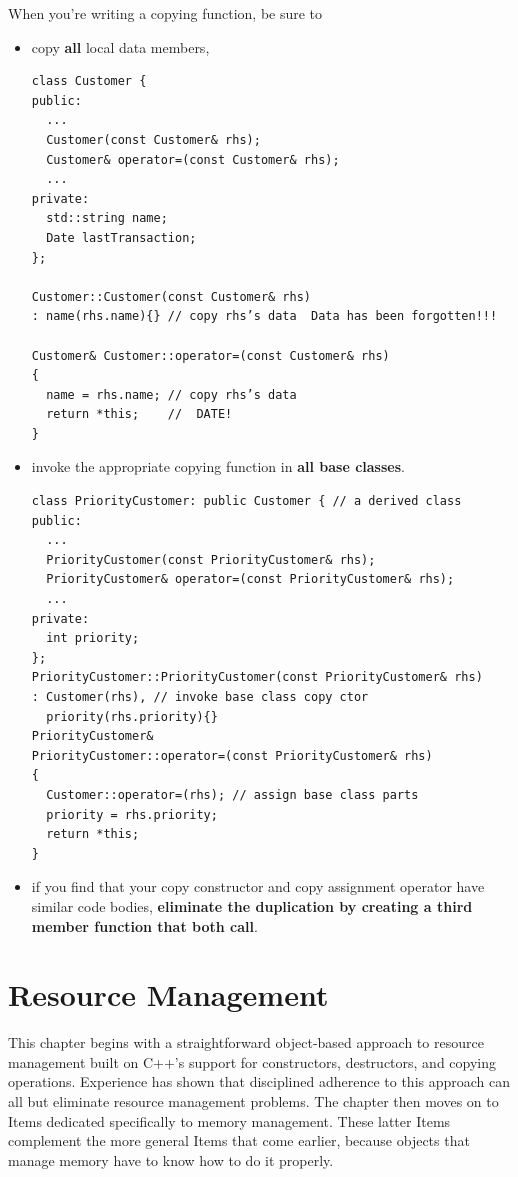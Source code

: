When you're writing a copying function, be sure to
\begin{itemize}
\item copy \textbf{all} local data members,
\begin{verbatim}
class Customer {
public:
  ...
  Customer(const Customer& rhs);
  Customer& operator=(const Customer& rhs);
  ...
private:
  std::string name;
  Date lastTransaction;
};

Customer::Customer(const Customer& rhs)
: name(rhs.name){} // copy rhs’s data  Data has been forgotten!!!

Customer& Customer::operator=(const Customer& rhs)
{
  name = rhs.name; // copy rhs’s data
  return *this;    //  DATE!
}
\end{verbatim}
\item invoke the appropriate copying function in \textbf{all base
    classes}.
\begin{verbatim}
class PriorityCustomer: public Customer { // a derived class
public:
  ...
  PriorityCustomer(const PriorityCustomer& rhs);
  PriorityCustomer& operator=(const PriorityCustomer& rhs);
  ...
private:
  int priority;
};
PriorityCustomer::PriorityCustomer(const PriorityCustomer& rhs)
: Customer(rhs), // invoke base class copy ctor
  priority(rhs.priority){}
PriorityCustomer&
PriorityCustomer::operator=(const PriorityCustomer& rhs)
{
  Customer::operator=(rhs); // assign base class parts
  priority = rhs.priority;
  return *this;
}
\end{verbatim}
\item if you find that your copy constructor and copy assignment
operator have similar code bodies, \textbf{eliminate the duplication by
creating a third member function that both call}.
\end{itemize}

\clearpage
\section{Resource Management}

This chapter begins with a straightforward object-based approach to
resource management built on C++'s support for constructors,
destructors, and copying operations. Experience has shown that
disciplined adherence to this approach can all but eliminate resource
management problems. The chapter then moves on to Items dedicated
specifically to memory management. These latter Items complement
the more general Items that come earlier, because objects that manage
memory have to know how to do it properly.

